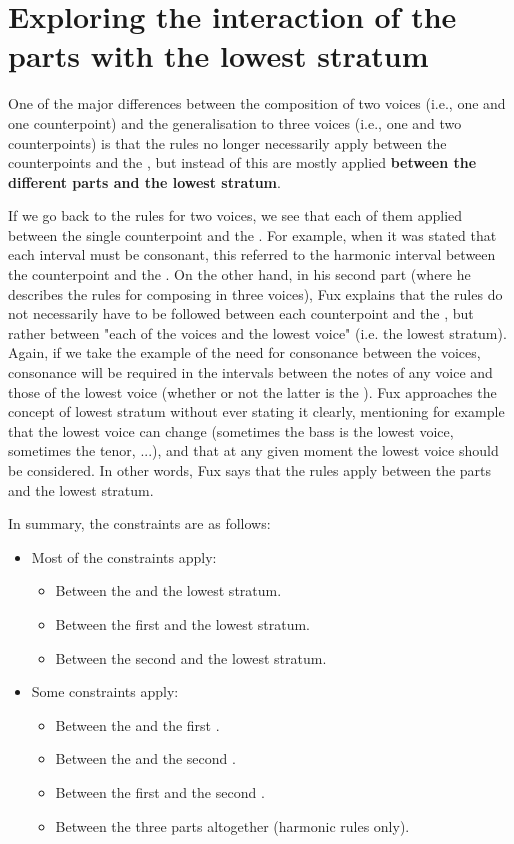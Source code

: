 \section{Exploring the interaction of the parts with the lowest stratum} \label{exploring-interaction-p-a}

One of the major differences between the composition of two voices (i.e., one \cfs and one counterpoint) and the generalisation to three voices (i.e., one \cfs and two counterpoints) is that the rules no longer necessarily apply between the counterpoints and the \cf, but instead of this are mostly applied \textbf{between the different parts and the lowest stratum}. 

If we go back to the rules for two voices, we see that each of them applied between the single counterpoint and the \cf. For example, when it was stated that each interval must be consonant, this referred to the harmonic interval between the counterpoint and the \cf.
On the other hand, in his second part (where he describes the rules for composing in three voices), Fux explains that the rules do not necessarily have to be followed between each counterpoint and the \cf, but rather between "each of the voices and the lowest voice" (i.e. the lowest stratum). Again, if we take the example of the need for consonance between the voices, consonance will be required in the intervals between the notes of any voice and those of the lowest voice (whether or not the latter is the \cf).
Fux approaches the concept of lowest stratum without ever stating it clearly, mentioning for example that the lowest voice can change (sometimes the bass is the lowest voice, sometimes the tenor, ...), and that at any given moment the lowest voice should be considered. In other words, Fux says that the rules apply between the parts and the lowest stratum.

In summary, the constraints are as follows:
\begin{itemize}
    \item Most of the constraints apply:
    \begin{itemize}
        \item Between the \cfs and the lowest stratum.
        \item Between the first \cps and the lowest stratum.
        \item Between the second \cps and the lowest stratum.
    \end{itemize}
    \item Some constraints apply:
    \begin{itemize}
        \item Between the \cfs and the first \cp.
        \item Between the \cfs and the second \cp.
        \item Between the first \cps and the second \cp.
        \item Between the three parts altogether (harmonic rules only).
    \end{itemize}

\end{itemize}


